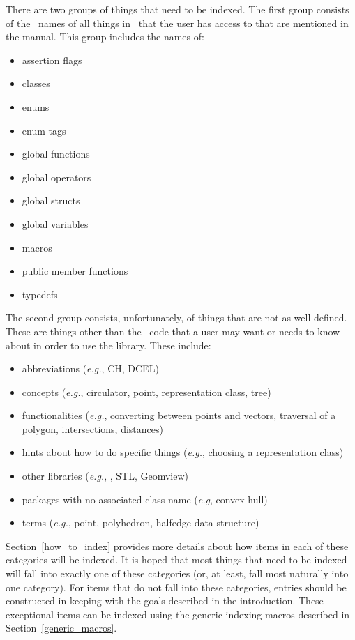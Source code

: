 \documentclass{article}
\begin{document}
There are two groups of things that need to be indexed.  The first group
consists of the \CC\ names of all things in \cgal\  that the user has access 
to that are mentioned in the manual.  This group includes the names of:
   \begin{itemize}
      \item assertion flags 
      \item classes
      \item enums
      \item enum tags
      \item global functions
      \item global operators
      \item global structs
      \item global variables 
      \item macros
      \item public member functions
      \item typedefs
   \end{itemize}

The second group consists, unfortunately, of things that are not as well 
defined.  These are things other than the \CC\ code
that a user may want or needs to know about in order 
to use the library.  These include:
   \begin{itemize}
      \item abbreviations ({\em e.g.}, CH, DCEL)
      \item concepts ({\em e.g.}, circulator, point, representation class, tree)
      \item functionalities ({\em e.g.}, converting between points and vectors,
                             traversal of a polygon, intersections, distances)
      \item hints about how to do specific things ({\em e.g.}, choosing a 
            representation class)
      \item other libraries ({\em e.g.}, \leda, STL, Geomview)
      \item packages with no associated class name ({\em e.g}, convex hull)
      \item terms ({\em e.g.}, point, polyhedron, halfedge data structure)
   \end{itemize}

Section~\ref{how_to_index} provides more details about how items in each of 
these categories will be indexed.
It is hoped that most things that need to be indexed will fall into exactly 
one of these categories (or, at least, fall most naturally into one category). 
For items that do not fall into these categories, entries should be 
constructed in keeping with the goals described in the introduction.
These exceptional items can be indexed using the generic
indexing macros described in Section~\ref{generic_macros}.  
\end{document}
